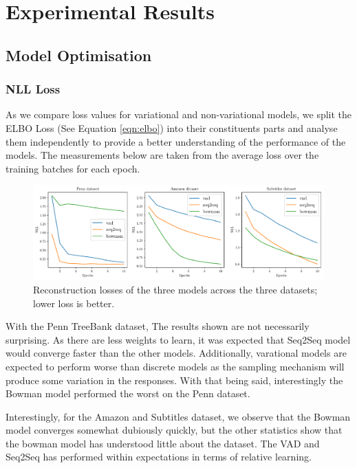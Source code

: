 \documentclass[12pt,twoside]{report}
\begin{document}
\chapter{Experimental Results}


\section{Model Optimisation}
\subsection{NLL Loss}

As we compare loss values for variational and non-variational models, we split the ELBO Loss (See Equation \ref{eqn:elbo}) into their constituents parts and analyse them independently to provide a better understanding of the performance of the models. The measurements below are taken from the average loss over the training batches for each epoch.

\begin{figure}[!ht]
	\centering
	\includegraphics[width=150mm]{results/nll.pdf}
	\caption{Reconstruction losses of the three models across the three datasets; lower loss is better. \label{r:nll}}
  \end{figure}

With the Penn TreeBank dataset, The results shown are not necessarily surprising. As there are less weights to learn, it was expected that Seq2Seq model would converge faster than the other models. Additionally, varational models are expected to perform worse than discrete models as the sampling mechanism will produce some variation in the responses. With that being said, interestingly the Bowman model performed the worst on the Penn dataset.

Interestingly, for the Amazon and Subtitles dataset, we observe that the Bowman model converges somewhat dubiously  quickly, but the other statistics show that the bowman model has understood little about the dataset. The VAD and Seq2Seq has performed within expectations in terms of relative learning.
\end{document}
